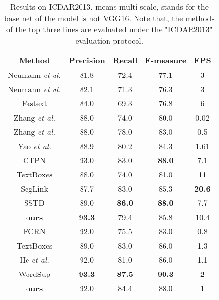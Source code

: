 \documentclass[10pt,twocolumn,letterpaper]{article}
\begin{document}
\begin{table}

\footnotesize
\begin{centering}
\begin{tabular}{|c|c|c|c|c|}
\hline 
\textbf{Method} & \textbf{Precision} & \textbf{Recall} & \textbf{F-measure} & \textbf{FPS} \tabularnewline
\hline 
\hline
Neumann \emph{et al.} \cite{neumann2015efficient} & 81.8 & 72.4 & 77.1 & 3  \tabularnewline

\hline 
Neumann \emph{et al.} \cite{neumann2016real} & 82.1 & 71.3  & 76.3  & 3 \tabularnewline

\hline
Fastext \cite{busta2015fastext} & 84.0 & 69.3 & 76.8 & 6  \tabularnewline
\hline 
Zhang \emph{et al.} \cite{zhang2015symmetry} & 88.0 & 74.0 & 80.0 & 0.02\tabularnewline
\hline
Zhang \emph{et al.} \cite{zhang2016multi} & 88.0  & 78.0  & 83.0 & 0.5 \tabularnewline

\hline 
Yao \emph{et al.} \cite{yao2016scene} & 88.9  & 80.2  & 84.3 & 1.61 \tabularnewline
\hline 
CTPN \cite{tian2016detecting} & 93.0  & 83.0  & \textbf{88.0} & 7.1 \tabularnewline

\hline
TextBoxes \cite{liao2017textboxes} & 88.0  & 74.0  & 81.0 & 11 \tabularnewline



\hline 
SegLink \cite{Shi_2017_CVPR} & 87.7  & 83.0 & 85.3 & \textbf{20.6}  \tabularnewline

\hline 
SSTD \cite{SSTD} & 89.0  & \textbf{86.0} & \textbf{88.0} & 7.7 \tabularnewline


\hline
\textbf{ours} & \textbf{93.3} & 79.4 & 85.8 & 10.4 \tabularnewline
\hline 
\hline
FCRN  \cite{gupta2016synthetic} & 92.0  & 75.5  & 83.0  & 0.8 \tabularnewline
\hline
TextBoxes  \cite{liao2017textboxes} & 89.0  & 83.0  & 86.0 & 1.3 \tabularnewline
\hline 
He \emph{et al.}   \cite{He_2017_ICCV} & 92.0  &  81.0 & 86.0 & 1.1  \tabularnewline
\hline
WordSup  \cite{Hu_2017_ICCV} & \textbf{93.3}  & \textbf{87.5}  &  \textbf{90.3} & \textbf{2} \tabularnewline
\hline 
\textbf{ours} & 92.0 & 84.4 & 88.0 & 1\tabularnewline
\hline
\end{tabular}
\par\end{centering}
\caption{Results on ICDAR2013.  means multi-scale,  stands for the base net of the model is not VGG16. Note that, the methods of the top three lines are evaluated under the "ICDAR2013" evaluation protocol.}
\label{tab_icdar2013}
\end{table}
\end{document}
